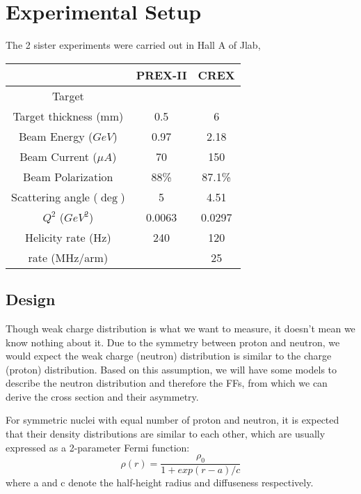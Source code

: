 \chapter{Experimental Setup}
The 2 sister experiments were carried out in Hall A of Jlab, 

\begin{table}[h]
    \centering
    \begin{tabular}{c | c c }
	\hline
	&   PREX-II & CREX  \\
	\hline
	Target	& \Pb	& \Ca	\\
	Target thickness (mm)	& 0.5	& 6	\\
	\hline
	Beam Energy ($GeV$) & 0.97 & 2.18  \\
	Beam Current ($\mu A$)	& 70	& 150	\\
	Beam Polarization & 88\%   & 87.1\%   \\
	Scattering angle ($\deg$)   & 5	& 4.51 \\
	$Q^2$ ($GeV^2$)	& 0.0063   & 0.0297	\\
	Helicity rate (Hz)  & 240   & 120   \\
	rate (MHz/arm)	&   & 25    \\
	\hline
    \end{tabular}
\end{table}

\section{Design}
Though weak charge distribution is what we want to measure, it doesn't mean we
know nothing about it. Due to the symmetry between proton and neutron, we would
expect the weak charge (neutron) distribution is similar to the charge (proton)
distribution. Based on this assumption, we will have some models to describe
the neutron distribution and therefore the FFs, from which we can derive the
cross section and their asymmetry.

For symmetric nuclei with equal number of proton and neutron, it is expected 
that their density distributions are similar to each other, which are usually
expressed as a 2-parameter Fermi function:
\begin{equation}
    \rho(r) = \frac{\rho_0}{1 + exp(r-a)/c}
\end{equation}
where a and c denote the half-height radius and diffuseness respectively. 

